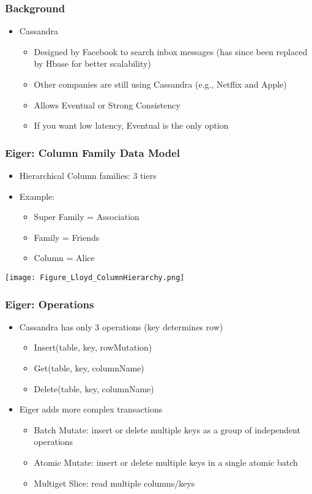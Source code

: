 \documentclass{beamer}
\begin{document}
\begin{frame}
\frametitle{Background}
\begin{itemize}
\pause \item Cassandra
	\begin{itemize}
		\item Designed by Facebook to search inbox messages (has since been replaced by Hbase for better scalability)
		\item Other companies are still using Cassandra (e.g., Netflix and Apple)
		\item Allows Eventual or Strong Consistency
		\item If you want low latency, Eventual is the only option
	\end{itemize}
\end{itemize}  
\end{frame}





\begin{frame}
\frametitle{Eiger: Column Family Data Model}
\begin{itemize}
\item Hierarchical Column families: 3 tiers

\pause \item Example:
	\begin{itemize}
		\item Super Family = Association
		\item Family = Friends
		\item Column = Alice
	\end{itemize}
\end{itemize}  
\texttt{[image: Figure\_Lloyd\_ColumnHierarchy.png]}
\end{frame}


\begin{frame}
\frametitle{Eiger: Operations}
\begin{itemize}
\pause \item Cassandra has only 3 operations (key determines row)
	\begin{itemize}
		\item Insert(table, key, rowMutation)
		\item Get(table, key, columnName)
		\item Delete(table, key, columnName)
	\end{itemize}
\pause \item Eiger adds more complex transactions
	\begin{itemize}
		\item Batch Mutate: insert or delete multiple keys as a group of independent operations
		\item Atomic Mutate: insert or delete multiple keys in a single atomic batch
		\item Multiget Slice: read multiple columns/keys
	\end{itemize}	
\end{itemize}  
\end{frame}
\end{document}
